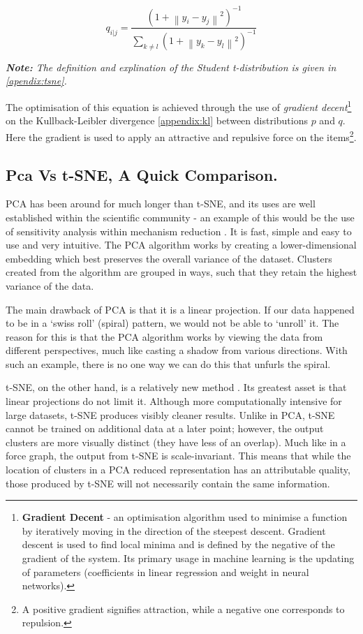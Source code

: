 \begin{equation}
q_{i|j} =\frac{(1 + \left \| y_i - y_j \right \|^2 )^{-1}}{\sum_{k \neq l} (1 + \left \| y_k - y_l \right \|^2 )^{-1} }
\end{equation}

\emph{\textbf{Note:} The definition and explination of the Student t-distribution is given in \autoref{apendix:tsne}.
}

The optimisation of this equation is achieved through the use of \emph{gradient decent}\footnote{\textbf{Gradient Decent} - an optimisation algorithm used to minimise a function by iteratively moving in the direction of the steepest descent. Gradient descent is used to find local minima and is defined by the negative of the gradient of the system. Its primary usage in machine learning is the updating of parameters (coefficients in linear regression and weight in neural networks).}
 on the Kullback-Leibler divergence \autoref{appendix:kl} between distributions $p$ and $q$. Here the gradient is used to apply an attractive and repulsive force on the items\footnote{A positive gradient signifies attraction, while a negative one corresponds to repulsion.}.




\subsection{Pca Vs t-SNE, A Quick Comparison.}

PCA has been around for much longer than t-SNE, and its uses are well established within the scientific community - an example of this would be the use of sensitivity analysis within mechanism reduction \citep{kinetics}. It is fast, simple and easy to use and very intuitive. The PCA algorithm works by creating a lower-dimensional embedding which best preserves the overall variance of the dataset. Clusters created from the algorithm are grouped in ways, such that they retain the highest variance of the data.

The main drawback of PCA is that it is a linear projection. If our data happened to be in a `swiss roll' (spiral) pattern, we would not be able to `unroll' it. The reason for this is that the PCA algorithm works by viewing the data from different perspectives, much like casting a shadow from various directions. With such an example, there is no one way we can do this that unfurls the spiral.

t-SNE, on the other hand, is a relatively new method \citep{tsne}. Its greatest asset is that linear projections do not limit it. Although more computationally intensive for large datasets, t-SNE produces visibly cleaner results. Unlike in PCA, t-SNE cannot be trained on additional data at a later point; however, the output clusters are more visually distinct (they have less of an overlap). Much like in a force graph, the output from t-SNE is scale-invariant. This means that while the location of clusters in a PCA reduced representation has an attributable quality, those produced by t-SNE will not necessarily contain the same information.

